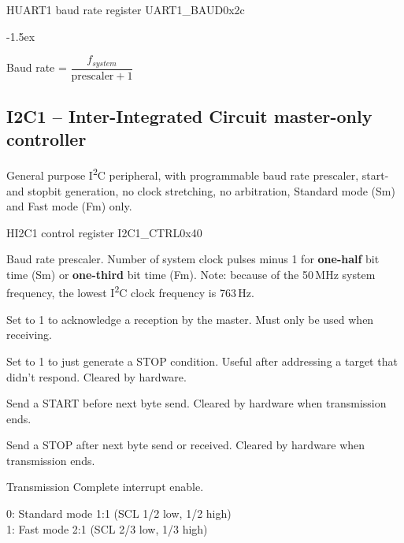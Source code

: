 \documentclass[12pt]{article}
\begin{document}
\begin{register}{H}{UART1 baud rate register UART1\_BAUD}{0x2c}
\label{uart1baud}
%
\regnewline%
\end{register}
\begin{regdesc}[0.6\textwidth]\begin{reglist}[000000000]
\itemsep-1.5ex
\item[Prescaler] Baud rate = $\dfrac{f_{system}}{\textrm{prescaler}+1}$
\end{reglist}\end{regdesc}


\subsection{I2C1 -- Inter-Integrated Circuit master-only controller}
General purpose I\textsuperscript{2}C peripheral, with programmable baud rate prescaler, start- and stopbit generation, no clock stretching, no arbitration, Standard mode (Sm) and Fast mode (Fm) only.

\begin{register}{H}{I2C1 control register I2C1\_CTRL}{0x40}
\label{i2c1ctrl}
%
%
%
%
%
%
%
%
%
\regnewline%
\end{register}
\begin{regdesc}[0.9\textwidth]\begin{reglist}[000000000]
\item [BAUD] Baud rate prescaler. Number of system clock pulses minus 1 for \textbf{one-half} bit time (Sm) or \textbf{one-third} bit time (Fm).
Note: because of the 50\,MHz system frequency, the lowest I\textsuperscript{2}C clock frequency is 763\,Hz.
\item [MACK] Set to 1 to acknowledge a reception by the master. Must only be used when receiving.
\item [HARDSTOP] Set to 1 to just generate a STOP condition. Useful after addressing a target that didn't respond. Cleared by hardware.
\item [START] Send a START before next byte send. Cleared by hardware when transmission ends.
\item [STOP] Send a STOP after next byte send or received. Cleared by hardware when transmission ends.
\item [TCIE] Transmission Complete interrupt enable.
\item [FM] 0: Standard mode 1:1 (SCL 1/2 low, 1/2 high)\\1: Fast mode 2:1 (SCL 2/3 low, 1/3 high)
\end{reglist}\end{regdesc}
\end{document}
